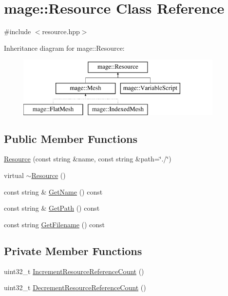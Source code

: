 \hypertarget{classmage_1_1_resource}{}\section{mage\+:\+:Resource Class Reference}
\label{classmage_1_1_resource}


{\ttfamily \#include $<$resource.\+hpp$>$}

Inheritance diagram for mage\+:\+:Resource\+:\begin{figure}[H]
\begin{center}
\leavevmode
\includegraphics[height=3.000000cm]{classmage_1_1_resource}
\end{center}
\end{figure}
\subsection*{Public Member Functions}
\begin{DoxyCompactItemize}
\item 
\hyperlink{classmage_1_1_resource_a7b4febc86646d51ac116732af01abcaf}{Resource} (const string \&name, const string \&path=\char`\"{}./\char`\"{})
\item 
virtual \hyperlink{classmage_1_1_resource_a80112db991a7dfd1dc0b24967981ac60}{$\sim$\+Resource} ()
\item 
const string \& \hyperlink{classmage_1_1_resource_a77713b0c74f8983afc2d42843afe8cbe}{Get\+Name} () const
\item 
const string \& \hyperlink{classmage_1_1_resource_a2ef6c6937947b56cbabc569e3a63ca71}{Get\+Path} () const
\item 
const string \hyperlink{classmage_1_1_resource_a3235bf2744390d5957b9b4038e4bb512}{Get\+Filename} () const
\end{DoxyCompactItemize}
\subsection*{Private Member Functions}
\begin{DoxyCompactItemize}
\item 
uint32\+\_\+t \hyperlink{classmage_1_1_resource_a0aee4b36717494677dbd6ba799f11ab4}{Increment\+Resource\+Reference\+Count} ()
\item 
uint32\+\_\+t \hyperlink{classmage_1_1_resource_a225b37285aa32d893a07d5b492ea99f9}{Decrement\+Resource\+Reference\+Count} ()
\end{DoxyCompactItemize}

